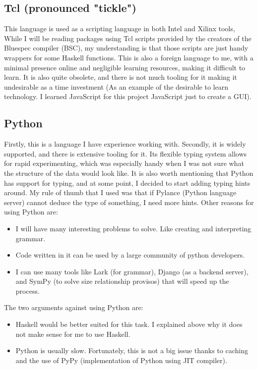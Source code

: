 \documentclass[12pt]{report}
\begin{document}
\subsection{Tcl (pronounced "tickle")}
This language is used as a scripting language in both Intel and Xilinx tools, While I will be reading packages using Tcl scripts provided by the creators of the Bluespec compiler (BSC), my understanding is that those scripts are just handy wrappers for some Haskell functions. This is also a foreign language to me, with a minimal presence online and negligible learning resources, making it difficult to learn. It is also quite obsolete, and there is not much tooling for it making it undesirable as a time investment (As an example of the desirable to learn technology. I learned JavaScript for this project JavaScript just to create a GUI). 
\subsection{Python}
Firstly, this is a language I have experience working with. Secondly, it is widely supported, and there is extensive tooling for it. Its flexible typing system allows for rapid experimenting, which was especially handy when I was not sure what the structure of the data would look like. It is also worth mentioning that Python has support for typing, and at some point, I decided to start adding typing hints around. My rule of thumb that I used was that if Pylance (Python language server) cannot deduce the type of something, I need more hints.  
Other reasons for using Python are:  
\begin{itemize}  
  \item I will have many interesting problems to solve. Like creating and interpreting grammar.  
  \item Code written in it can be used by a large community of python developers.  
  \item I can use many tools like Lark (for grammar), Django (as a backend server), and SymPy (to solve size relationship provisos) that will speed up the process.  
\end{itemize}  
The two arguments against using Python are:  
\begin{itemize}  
  \item Haskell would be better suited for this task. I explained above why it does not make sense for me to use Haskell.  
  \item Python is usually slow. Fortunately, this is not a big issue thanks to caching and the use of PyPy (implementation of Python using JIT compiler).  
\end{itemize} 
\end{document}
